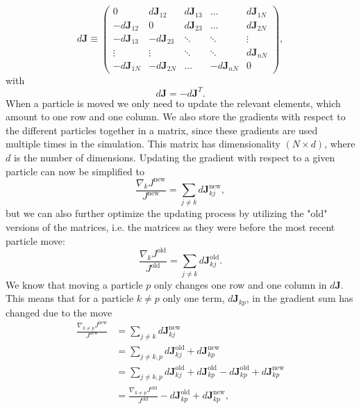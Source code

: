 \documentclass[../main.tex]{subfiles}
\begin{document}
\begin{equation}
    d\mathbf{J} \equiv 
    \left( \begin{array}{ccccc} 0 & d\mathbf{J}_{12} & d\mathbf{J}_{13} & \dots & d\mathbf{J}_{1N}\\
                                -d\mathbf{J}_{12} & 0 & d\mathbf{J}_{23} & \dots & d\mathbf{J}_{2N}\\
                                -d\mathbf{J}_{13} & -d\mathbf{J}_{23} & \ddots & \ddots & \vdots\\
                                \vdots & \vdots & \ddots & \ddots & d\mathbf{J}_{nN}\\
                                -d\mathbf{J}_{1N} & -d\mathbf{J}_{2N} & \dots & -d\mathbf{J}_{nN} & 0

             \end{array} \right),
\end{equation}
with 
\begin{equation}
    d\mathbf{J} = -d\mathbf{J}^T.
\end{equation}
When a particle is moved we only need to update the relevant elements, which amount to one row and one column. We also store the gradients with respect to the different particles together in a matrix, since these gradients are used multiple times in the simulation. This matrix has dimensionality $(N\times d)$, where $d$ is the number of dimensions. Updating the gradient with respect to a given particle can now be simplified to 
\begin{equation}\label{eq:GradientSum}
    \frac{\nabla_k J^\textrm{new}}{J^\textrm{new}} = \sum_{j\neq k} d\mathbf{J}_{kj}^\textrm{new}, 
\end{equation}
but we can also further optimize the updating process by utilizing the "old" versions of the matrices, i.e. the matrices as they were before the most recent particle move: 
\begin{equation}
    \frac{\nabla_k J^\textrm{old}}{J^\textrm{old}} = \sum_{j\neq k} d\mathbf{J}_{kj}^\textrm{old}.
\end{equation}
We know that moving a particle $p$ only changes one row and one column in $d\mathbf{J}$. This means that for a particle $k\neq p$ only one term, $d\mathbf{J}_{kp}$, in the gradient sum has changed due to the move 
\begin{equation}\label{eq:UpdateGradient}
\begin{split}
    \frac{\nabla_{k\neq p} J^\textrm{new}}{J^\textrm{new}} &= \sum_{j\neq k} d\mathbf{J}_{kj}^\textrm{new}\\
    &= \sum_{j\neq k,p} d\mathbf{J}_{kj}^\textrm{old} + d\mathbf{J}_{kp}^\textrm{new}\\
    &= \sum_{j\neq k,p} d\mathbf{J}_{kj}^\textrm{old} + d\mathbf{J}_{kp}^\textrm{old} - d\mathbf{J}_{kp}^\textrm{old} + d\mathbf{J}_{kp}^\textrm{new}\\
    &= \frac{\nabla_{k\neq p} J^\textrm{old}}{J^\textrm{old}} - d\mathbf{J}_{kp}^\textrm{old} + d\mathbf{J}_{kp}^\textrm{new},
\end{split}
\end{equation}
\end{document}
